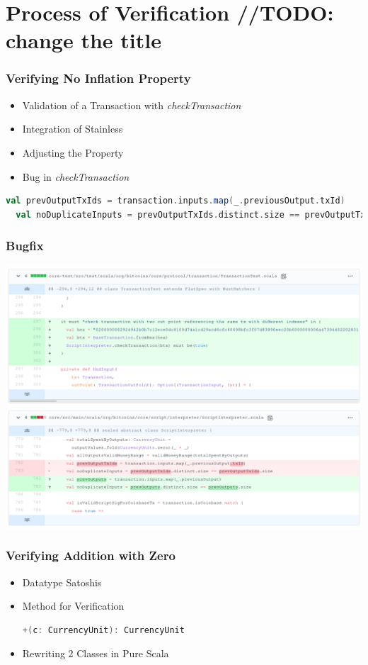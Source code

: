 \documentclass{beamer}
\begin{document}
\section{Process of Verification //TODO: change the title}


\begin{frame}[fragile]
\frametitle{Verifying No Inflation Property}
\begin{itemize}
  \item Validation of a Transaction with \textit{checkTransaction}
  \item Integration of Stainless
  \item Adjusting the Property
  \item Bug in \textit{checkTransaction}
\end{itemize}
\pause
\begin{lstlisting}[language=Scala]
  val prevOutputTxIds = transaction.inputs.map(_.previousOutput.txId)
  val noDuplicateInputs = prevOutputTxIds.distinct.size == prevOutputTxIds.size
\end{lstlisting}
\end{frame}


\begin{frame}
\frametitle{Bugfix}
\centering
\includegraphics[width=\textwidth,height=0.8\textheight,keepaspectratio]{assets/bitcoin-s-pr.png}
\end{frame}


\begin{frame}[fragile]
\frametitle{Verifying Addition with Zero}
\begin{itemize}%
  \item Datatype Satoshis
  \item Method for Verification
  \begin{lstlisting}[language=Scala, numbers=none]
    +(c: CurrencyUnit): CurrencyUnit
  \end{lstlisting}
  \item Rewriting 2 Classes in Pure Scala
\end{itemize}
\end{frame}
\end{document}
